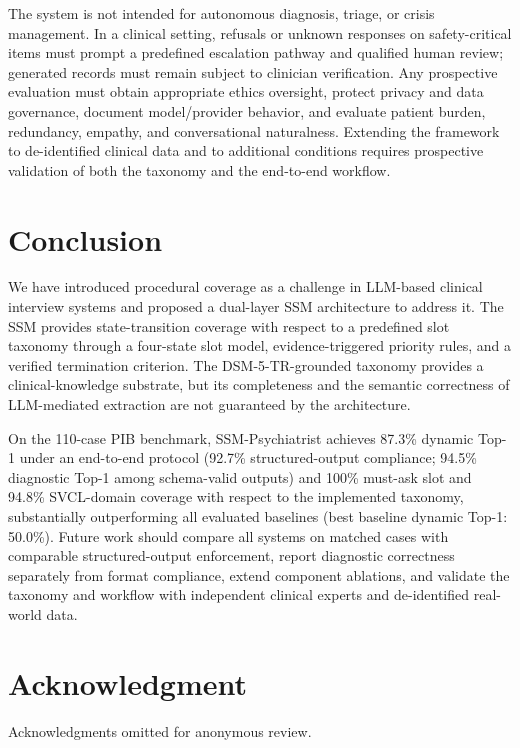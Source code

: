 \documentclass[conference]{IEEEtran}
\begin{document}
The system is not intended for autonomous diagnosis, triage, or crisis management. In a clinical setting, refusals or unknown responses on safety-critical items must prompt a predefined escalation pathway and qualified human review; generated records must remain subject to clinician verification. Any prospective evaluation must obtain appropriate ethics oversight, protect privacy and data governance, document model/provider behavior, and evaluate patient burden, redundancy, empathy, and conversational naturalness. Extending the framework to de-identified clinical data and to additional conditions requires prospective validation of both the taxonomy and the end-to-end workflow.


\section{Conclusion}

We have introduced procedural coverage as a challenge in LLM-based clinical interview systems and proposed a dual-layer SSM architecture to address it. The SSM provides state-transition coverage with respect to a predefined slot taxonomy through a four-state slot model, evidence-triggered priority rules, and a verified termination criterion. The DSM-5-TR-grounded taxonomy provides a clinical-knowledge substrate, but its completeness and the semantic correctness of LLM-mediated extraction are not guaranteed by the architecture.

On the 110-case PIB benchmark, SSM-Psychiatrist achieves 87.3\% dynamic Top-1 under an end-to-end protocol (92.7\% structured-output compliance; 94.5\% diagnostic Top-1 among schema-valid outputs) and 100\% must-ask slot and 94.8\% SVCL-domain coverage with respect to the implemented taxonomy, substantially outperforming all evaluated baselines (best baseline dynamic Top-1: 50.0\%). Future work should compare all systems on matched cases with comparable structured-output enforcement, report diagnostic correctness separately from format compliance, extend component ablations, and validate the taxonomy and workflow with independent clinical experts and de-identified real-world data.


\section*{Acknowledgment}
Acknowledgments omitted for anonymous review.



\end{document}
